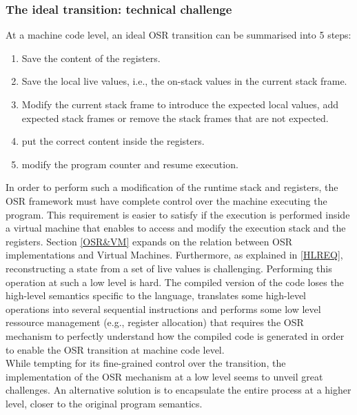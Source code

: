 \subsubsection{The ideal transition: technical challenge}
At a machine code level, an ideal OSR transition can be summarised into 5 steps: 
\begin{enumerate}
    \item Save the content of the registers.
    \item Save the local live values, i.e., the on-stack values in the current stack frame.
    \item Modify the current stack frame to introduce the expected local values, add expected stack frames or remove the stack frames that are not expected.
    \item put the correct content inside the registers.
    \item modify the program counter and resume execution.
\end{enumerate}
In order to perform such a modification of the runtime stack and registers, the OSR framework must have complete control over the machine executing the program.
This requirement is easier to satisfy if the execution is performed inside a virtual machine that enables to access and modify the execution stack and the registers.
Section \ref{OSR&VM} expands on the relation between OSR implementations and Virtual Machines.
Furthermore, as explained in \ref{HLREQ}, reconstructing a state from a set of live values is challenging. 
Performing this operation at such a low level is hard.
The compiled version of the code loses the high-level semantics specific to the language, translates some high-level operations into several sequential instructions and performs some low level ressource management (e.g., register allocation) that requires the OSR mechanism to perfectly understand how the compiled code is generated in order to enable the OSR transition at machine code level.\\

While tempting for its fine-grained control over the transition, the implementation of the OSR mechanism at a low level seems to unveil great challenges.
An alternative solution is to encapsulate the entire process at a higher level, closer to the original program semantics.

